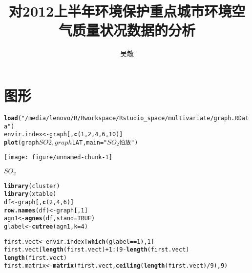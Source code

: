 \documentclass[12pt,oneside]{report}\usepackage{graphicx, color}
\makeatletter
\def\maxwidth{ %
  \ifdim\Gin@nat@width>\linewidth
    \linewidth
  \else
    \Gin@nat@width
  \fi
}
\newcommand{\hlfunctioncall}[1]{\textcolor[rgb]{0.501960784313725,0,0.329411764705882}{\textbf{#1}}}%
\newcommand{\hlstring}[1]{\textcolor[rgb]{0.6,0.6,1}{#1}}%
\newenvironment{kframe}{%
 \def\at@end@of@kframe{}%
 \ifinner\ifhmode%
  \def\at@end@of@kframe{\end{minipage}}%
  \begin{minipage}{\columnwidth}%
 \fi\fi%
 \def\FrameCommand##1{\hskip\@totalleftmargin \hskip-\fboxsep
 \colorbox{shadecolor}{##1}\hskip-\fboxsep
     \hskip-\linewidth \hskip-\@totalleftmargin \hskip\columnwidth}%
 \MakeFramed {\advance\hsize-\width
   \@totalleftmargin\z@ \linewidth\hsize
   \@setminipage}}%
 {\par\unskip\endMakeFramed%
 \at@end@of@kframe}
\newenvironment{knitrout}{}{} %
\makeatother
\begin{document}
\title{\textbf{对2012上半年环境保护重点城市环境空气质量状况数据的分析}}
\author{吴敏}
\maketitle
\section*{图形}
\begin{knitrout}
\color{fgcolor}\begin{kframe}
\begin{alltt}
\hlfunctioncall{load}(\hlstring{"/media/lenovo/R/Rworkspace/Rstudio_space/multivariate/graph.RData"})
envir.index <- graph[, \hlfunctioncall{c}(1, 2, 4, 6, 10)]
\hlfunctioncall{plot}(graph$SO2, graph$LAT, main = \hlstring{"$SO_2$怕放"})
\end{alltt}
\end{kframe}

{\centering \texttt{[image: figure/unnamed-chunk-1]} 

}


\end{knitrout}

$SO_2$

\begin{knitrout}
\color{fgcolor}\begin{kframe}
\begin{alltt}
\hlfunctioncall{library}(cluster)
\hlfunctioncall{library}(xtable)
df <- graph[, \hlfunctioncall{c}(2, 4, 6)]
\hlfunctioncall{row.names}(df) <- graph[, 1]
agn1 <- \hlfunctioncall{agnes}(df, stand = TRUE)
glabel <- \hlfunctioncall{cutree}(agn1, k = 4)
\end{alltt}
\end{kframe}
\end{knitrout}

\begin{knitrout}
\color{fgcolor}\begin{kframe}
\begin{alltt}
first.vect <- envir.index[\hlfunctioncall{which}(glabel == 1), 1]
first.vect[\hlfunctioncall{length}(first.vect) + 1:(9 - \hlfunctioncall{length}(first.vect)%%9)] <- \hlfunctioncall{rep}(NA, 9 - 
    \hlfunctioncall{length}(first.vect)%%9)
first.matrix <- \hlfunctioncall{matrix}(first.vect, \hlfunctioncall{ceiling}(\hlfunctioncall{length}(first.vect)/9), 9)
\end{alltt}
\end{kframe}
\end{knitrout}
\end{document}
